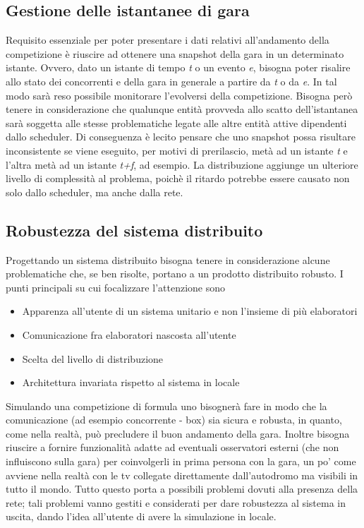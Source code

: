 \subsection{Gestione delle istantanee di gara}
Requisito essenziale per poter presentare i dati relativi all'andamento della
competizione è riuscire ad ottenere una
snapshot della gara in un determinato istante. Ovvero, dato un istante di tempo
\emph{t} o un evento \emph{e}, bisogna
poter risalire allo stato dei concorrenti e della gara in generale a partire da \emph{t} o da \emph{e}. 
In tal modo sarà reso possibile
monitorare l'evolversi della competizione. Bisogna però tenere in considerazione
che qualunque entità provveda allo scatto
dell'istantanea sarà soggetta alle stesse problematiche legate alle altre entità
attive dipendenti dallo scheduler. 
Di conseguenza è lecito pensare che uno snapshot possa risultare inconsistente
se viene eseguito, per motivi di 
prerilascio, metà ad un istante
\emph{t} e l'altra metà ad un istante \emph{t+f}, ad esempio. La distribuzione
aggiunge un ulteriore livello di complessità
al problema, poichè il ritardo potrebbe essere causato non solo dallo scheduler,
ma anche dalla rete.
\subsection{Robustezza del sistema distribuito }
Progettando un sistema distribuito bisogna tenere in considerazione alcune
problematiche che, se ben risolte, portano a un prodotto distribuito robusto.
I punti principali su cui focalizzare l'attenzione sono
\begin{itemize}
\item Apparenza all'utente di un sistema unitario e non l'insieme di pi\`{u}
elaboratori
\item Comunicazione fra elaboratori nascosta all'utente
\item Scelta del livello di distribuzione
\item Architettura invariata rispetto al sistema in locale
\end{itemize}
Simulando una competizione di formula uno bisognerà fare in modo che la comunicazione (ad esempio concorrente - box) sia sicura e robusta, in quanto, come nella realtà, può precludere il buon andamento della gara. Inoltre bisogna riuscire a fornire funzionalità adatte ad eventuali osservatori esterni (che non influiscono sulla gara) per coinvolgerli in prima persona con la gara, un po' come avviene nella realtà con le tv collegate direttamente dall'autodromo ma visibili in tutto il mondo. Tutto questo porta a possibili problemi dovuti alla presenza della rete; tali problemi vanno gestiti e considerati per dare robustezza al sistema in uscita, dando l'idea all'utente di avere la simulazione in locale.
